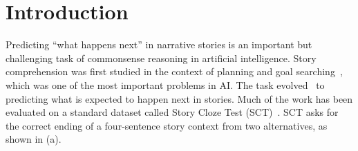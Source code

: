 \section{Introduction}
\label{sec:intro}

 

Predicting ``what happens next'' in narrative stories is an important
but challenging task of commonsense reasoning in artificial intelligence. 
Story comprehension was first studied in the context of 
planning and goal searching~\cite{meehan1977tale}, which was one of the
most important problems in AI. The task evolved~\cite{chambers2008unsupervised}
to predicting what is expected to happen next in stories. Much of the work
has been evaluated on a standard dataset called 
Story Cloze Test (SCT)~\cite{mostafazadeh2016corpus}. 
SCT asks for the correct ending of a four-sentence
story context from two alternatives, as shown in
(a). 

